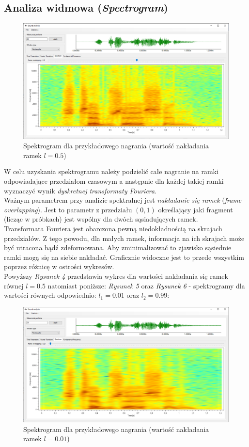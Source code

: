 \documentclass[a4paper]{article}
\begin{document}
\subsection{Analiza widmowa (\textit{Spectrogram})}
\begin{figure}[H]
  \includegraphics[width=\linewidth]{images/04spectrogram.png}
  \caption{Spektrogram dla przykładowego nagrania (wartość nakładania ramek $l=0.5$)}
\end{figure}
W celu uzyskania spektrogramu należy podzielić całe nagranie na ramki odpowiadające przedziałom czasowym a następnie dla każdej takiej ramki wyznaczyć wynik \textit{dyskretnej transformaty Fouriera}.\\
Ważnym parametrem przy analizie spektralnej jest \textit{nakładanie się ramek} (\textit{frame overlapping}). Jest to parametr z przedziału $(0, 1)$ określający jaki fragment (licząc w próbkach) jest wspólny dla dwóch sąsiadujących ramek.\\
Transformata Fouriera jest obarczona pewną niedokładnością na skrajach przedziałów. Z tego powodu, dla małych ramek, informacja na ich skrajach może być utracona bądź zdeformowana. Aby zminimalizować to zjawisko sąsiednie ramki mogą się na siebie nakładać. Graficznie widoczne jest to przede wszystkim poprzez różnicę w ostrości wykresów.\\
Powyższy \textit{Rysunek 4} przedstawia wykres dla wartości nakładania się ramek równej $l = 0.5$ natomiast poniższe: \textit{Rysunek 5} oraz \textit{Rysunek 6} - spektrogramy dla wartości równych odpowiednio: $l_1 = 0.01$ oraz $l_2 = 0.99$:
\begin{figure}[H]
  \includegraphics[width=\linewidth]{images/05spectrogramLowOverlap.png}
  \caption{Spektrogram dla przykładowego nagrania (wartość nakładania ramek $l=0.01$)}
\end{figure}
\end{document}
